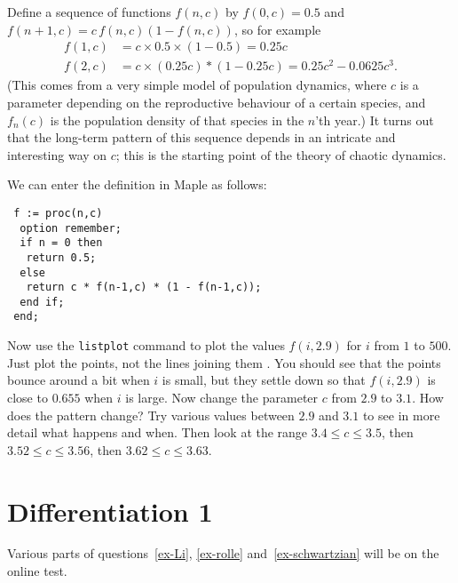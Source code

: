 \documentclass[a4paper,10pt]{amsbook}
\numberwithin{example}{chapter}
\begin{document}
\begin{exercise}
 Define a sequence of functions $f(n,c)$ by $f(0,c)=0.5$ and
 $f(n+1,c)=c\,f(n,c)(1-f(n,c))$, so for example
 \begin{align*}
  f(1,c) &= c\times 0.5 \times (1-0.5) = 0.25 c \\
  f(2,c) &= c \times (0.25 c) * (1-0.25c) = 0.25c^2 - 0.0625 c^3. 
 \end{align*}
 (This comes from a very simple model of population dynamics, where
 $c$ is a parameter depending on the reproductive behaviour of a
 certain species, and $f_n(c)$ is the population density of that
 species in the $n$'th year.)  It turns out that the long-term
 pattern of this sequence depends in an intricate and interesting way
 on $c$; this is the starting point of the theory of chaotic
 dynamics. 

 We can enter the definition in Maple as follows:
\begin{verbatim}
 f := proc(n,c)
  option remember;
  if n = 0 then
   return 0.5;
  else 
   return c * f(n-1,c) * (1 - f(n-1,c));
  end if;
 end;
\end{verbatim}
 Now use the \verb~listplot~ command to plot the values $f(i,2.9)$
 for $i$ from $1$ to $500$.  Just plot the points, not the lines
 joining them \note{\NOTElistplotstyle}.  You should see that the
 points bounce around a bit when $i$ is small, but they settle down so
 that $f(i,2.9)$ is close to $0.655$ when $i$ is large.  Now change
 the parameter $c$ from $2.9$ to $3.1$.  How does the pattern change?
 Try various values between $2.9$ and $3.1$ to see in more detail what
 happens and when.  Then look at the range $3.4\leq c\leq 3.5$, then
 $3.52\leq c\leq 3.56$, then $3.62\leq c\leq 3.63$. 

\end{exercise}

\chapter{Differentiation 1}

Various parts of questions~\ref{ex-Li}, \ref{ex-rolle}
and~\ref{ex-schwartzian} will be on the online test.
\end{document}
